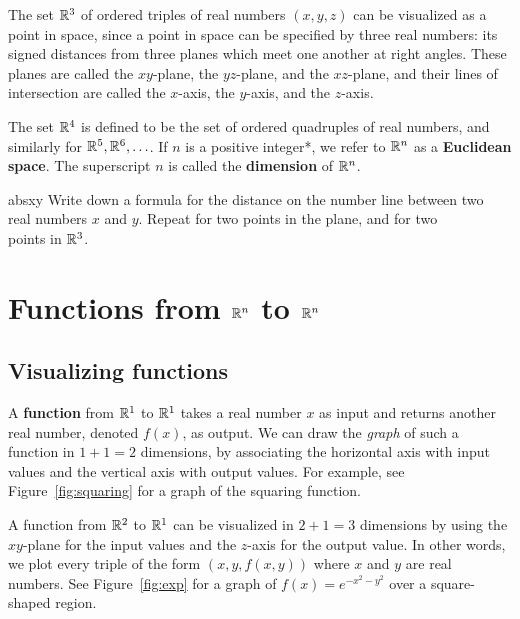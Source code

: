 \documentclass[svgnames]{report}
\begin{document}
The set $\mathbb{R}^3$ of ordered triples of real numbers $(x,y,z)$ can be
visualized as a point in space, since a point in space can be
specified by three real numbers: its signed distances from three
planes which meet one another at right angles. These planes are called
the $xy$-plane, the $yz$-plane, and the $xz$-plane, and their lines of
intersection are called the $x$-axis, the $y$-axis, and the $z$-axis. 

The set $\mathbb{R}^4$ is defined to be the set of ordered quadruples of real
numbers, and similarly for $\mathbb{R}^5, \mathbb{R}^6, \ldots$.  
 If
$n$ is a positive integer*, we refer to $\mathbb{R}^n$ as a \textbf{Euclidean
  space}. The superscript $n$
is called the \textbf{dimension} of $\mathbb{R}^n$. 

\begin{exercise}{}{absxy}
  Write down a formula for the distance on the number line between two \\
  real numbers $x$ and $y$. Repeat for two points in the plane, and
  for two \\ points in $\mathbb{R}^3$. 
\end{exercise}

\section{Functions from $\mathbb{R}^n$ to $\mathbb{R}^n$} 

\subsection{Visualizing functions}

A \textbf{function} from $\mathbb{R}^1$ to $\mathbb{R}^1$ takes a real number $x$ as
input and returns another real number, denoted $f(x)$, as output. We
can draw the \textit{graph} of such a function in $1 + 1 = 2$
dimensions, by associating the horizontal axis with input values and
the vertical axis with output values. For example, see
Figure~\ref{fig:squaring} for a graph of the squaring function.

A function from $\mathbb{R}^2$ to $\mathbb{R}^1$ can be visualized in $2 + 1 = 3$
dimensions by using the $xy$-plane for the input values and the
$z$-axis for the output value. In other words, we plot every triple of
the form $(x,y,f(x,y))$ where $x$ and $y$ are real numbers. See
Figure~\ref{fig:exp} for a graph of $f(x) = e^{-x^2 - y^2}$ over a
square-shaped region.
\end{document}
